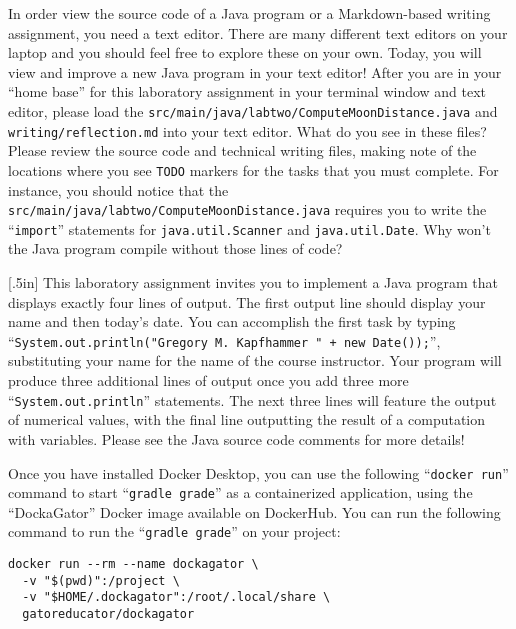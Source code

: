 \documentclass[11pt]{article}
\newcommand{\mainprogramsource}{\lstinline{src/main/java/labtwo/ComputeMoonDistance.java}}
\newcommand{\reflection}{\lstinline{writing/reflection.md}}
\newcommand{\command}[1]{``\lstinline{#1}''}
\newcommand{\program}[1]{\lstinline{#1}}
\newcommand{\think}[1]{\null\hfill\LARGE{\faCogs{}}\newline\scriptsize{\em{#1}}}
\begin{document}
In order view the source code of a Java program or a Markdown-based writing
assignment, you need a text editor. There are many different text editors on
your laptop and you should feel free to explore these on your own. Today, you
will view and improve a new Java program in your text editor! After you are in
your ``home base'' for this laboratory assignment in your terminal window and
text editor, please load the \mainprogramsource{} and \reflection{} into your
text editor. What do you see in these files? Please review the source code and
technical writing files, making note of the locations where you see
\program{TODO} markers for the tasks that you must complete. For instance, you
should notice that the \mainprogramsource{} requires you to write the
\command{import} statements for \program{java.util.Scanner} and
\program{java.util.Date}. Why won't the Java program compile without those lines
of code?

\marginnote{\think{Use program variables}}[.5in] This laboratory assignment
invites you to implement a Java program that displays exactly four lines of
output. The first output line should display your name and then today's date.
You can accomplish the first task by typing \command{System.out.println("Gregory
M. Kapfhammer " + new Date());}, substituting your name for the name of the
course instructor. Your program will produce three additional lines of output
once you add three more \command{System.out.println} statements. The next three
lines will feature the output of numerical values, with the final line
outputting the result of a computation with variables. Please see the Java
source code comments for more details!

Once you have installed Docker Desktop, you can use the following
\command{docker run} command to start \command{gradle grade} as a containerized
application, using the ``DockaGator'' Docker image available on DockerHub. You
can run the following command to run the \command{gradle grade} on your project:

\begin{verbatim}
docker run --rm --name dockagator \
  -v "$(pwd)":/project \
  -v "$HOME/.dockagator":/root/.local/share \
  gatoreducator/dockagator
\end{verbatim}
\end{document}
